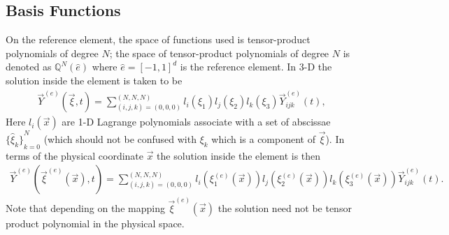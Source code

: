 \documentclass{report}
\begin{document}
{\subsection{Basis Functions}
On the reference element, the space of functions used is tensor-product
polynomials of degree $N$; the space of tensor-product polynomials of degree $N$
is denoted as $\mathbb{Q}^{N}(\hat{e})$ where $\hat{e} = {[-1, 1]}^d$ is the
reference element. In 3-D the solution inside the element is taken to be
\begin{align}
  \vec{Y}^{(e)}(\vec{\xi}, t) = \sum_{(i,j,k) = (0,0,0)}^{(N,N,N)}
  l_{i}(\xi_{1}) l_{j}(\xi_{2}) l_{k}(\xi_{3})
  \vec{Y}_{ijk}^{(e)}(t),
\end{align}
Here $l_{i}(\vec{x})$ are 1-D Lagrange polynomials associate with a set of
abscissae ${\{\hat{\xi}_{k}\}}_{k=0}^{N}$ (which should not be confused with
$\xi_{k}$ which is a component of $\vec{\xi}$). In terms of the physical
coordinate $\vec{x}$ the solution inside the element is then
\begin{align}
  \vec{Y}^{(e)}(\vec{\xi}^{(e)}(\vec{x}), t) = \sum_{(i,j,k) = (0,0,0)}^{(N,N,N)}
  l_{i}(\xi_{1}^{(e)}(\vec{x})) l_{j}(\xi_{2}^{(e)}(\vec{x}))
  l_{k}(\xi_{3}^{(e)}(\vec{x}))
  \vec{Y}_{ijk}^{(e)}(t).
\end{align}
Note that depending on the mapping $\vec{\xi}^{(e)}(\vec{x})$ the solution need
not be tensor product polynomial in the physical space.

}
\end{document}
